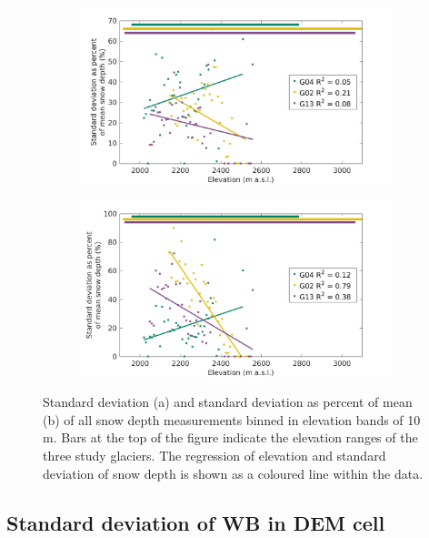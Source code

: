 \documentclass{sfuthesis}
\begin{document}
\begin{appendices}
\begin{figure}
    \centering
    \begin{subfigure}[b]{0.8\textwidth}
        \includegraphics[width=\textwidth]{binned_std.png}
        \caption[]{}
    \end{subfigure}
    
    \begin{subfigure}[b]{0.8\textwidth}
        \includegraphics[width=\textwidth]{binned_std_percent.png}
        \caption[]{}
    \end{subfigure}

    \caption[]{Standard deviation (a) and standard deviation as percent of mean (b) of all snow depth measurements binned in elevation bands of 10 m. Bars at the top of the figure indicate the elevation ranges of the three study glaciers. The regression of elevation and standard deviation of snow depth is shown as a coloured line within the data.}
    \label{fig:std_snowdepth_binned}
\end{figure}

\subsection{Standard deviation of WB in DEM cell}


\end{appendices}
\end{document}
